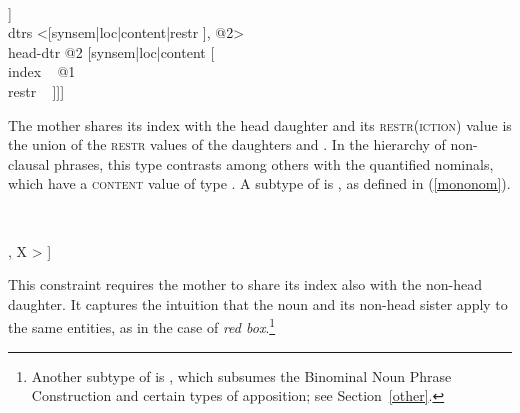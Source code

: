 \documentclass[output=paper
	        ,collection
	        ,collectionchapter
 	        ,biblatex
                ,babelshorthands
                ,newtxmath
                ,draftmode
                ,colorlinks, citecolor=brown
]{langscibook}
\begin{document}
\begin{exe}
\ex\label{param} 
 ~ \impl ~
\begin{avm}
[synsem|loc [category|head ~ \type{noun}                              \\
             content [\type{parameter}                               \\
                      index ~ @1                                       \\
                      restr ~ \ibox{\Sigma_{1}} $\cup$ \ibox{\Sigma_{2}}]] \\
 dtrs <[synsem|loc|content|restr  ], @2>     \\
 head-dtr @2 [synsem|loc|content [                  \\
                                    index ~ @1                         \\
                                    restr ~  ]]]
\end{avm}
\end{exe}

\noindent
The mother shares its index with the head daughter  and 
its \textsc{restr(iction)} value is the union of the \textsc{restr} values 
of the daughters  and . 
In the hierarchy of non-clausal phrases, this type contrasts among others with 
the quantified nominals, which have a \textsc{content} value of type 
 \citep[203--205]{GS00}. A subtype of  is  
, as defined in (\ref{mononom}).

\begin{exe}
\ex\label{mononom} 
 ~ \impl ~ 
\begin{avm}
[synsem|loc|content|index ~ @1      \\
 dtrs <[synsem|loc|content|index ~ @1 ], X > ]
\end{avm}
\end{exe}

\noindent 
This constraint requires the mother to share its index also with the 
non-head daughter. It captures the intuition that the 
noun and its non-head sister apply to the same entities, as in 
the case of \emph{red box}.\footnote{Another subtype of  
is , which subsumes 
the Binominal Noun Phrase Construction and certain types of apposition;
see Section~\ref{other}.}  
\end{document}
